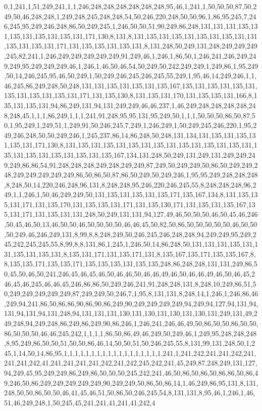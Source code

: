 0,1,241,1,51,249,241,1,1,246,248,248,248,248,248,248,95,46,1,241,1,50,50,50,87,50,249,50,46,248,248,1,249,248,245,248,248,54,50,246,220,248,50,50,96,1,86,95,245,7,246,245,95,249,246,248,86,50,249,245,1,246,50,50,51,90,249,86,248,131,131,131,135,131,135,131,135,131,135,131,171,130,8,131,8,131,135,131,135,131,135,131,135,131,131,135,131,135,131,171,131,135,135,131,135,131,8,131,248,50,249,131,248,249,249,249,245,82,241,1,246,249,249,249,249,249,91,249,46,1,246,1,86,50,1,246,241,246,249,249,249,95,249,249,249,46,1,246,1,46,50,46,54,50,249,50,242,249,249,1,249,86,1,95,249,50,14,246,245,95,46,50,249,1,50,249,246,245,246,245,55,249,1,95,46,14,249,246,1,1,46,245,86,249,248,50,248,131,131,135,131,135,131,135,167,135,131,135,131,135,131,135,131,135,131,135,131,171,131,135,130,8,131,135,131,170,131,135,135,131,166,8,135,131,135,131,94,86,249,131,94,131,249,249,46,46,237,1,46,249,248,248,248,248,248,248,45,1,1,1,86,249,1,1,1,241,91,248,95,95,131,95,249,50,1,1,1,50,50,50,86,50,87,50,1,95,249,1,249,51,1,249,91,50,246,245,7,249,1,246,249,1,50,249,245,246,220,1,95,249,246,248,50,50,249,246,1,245,237,86,14,86,248,50,248,131,134,131,135,131,135,131,135,131,171,130,8,131,135,131,135,131,135,131,135,131,135,131,135,131,135,131,135,131,135,131,135,131,135,131,135,167,134,131,248,50,249,131,249,131,249,249,249,249,86,86,54,91,248,248,248,249,248,249,249,87,249,50,249,249,50,86,50,249,249,248,249,249,249,249,249,86,50,86,50,87,86,50,249,50,249,246,1,95,95,249,248,248,248,8,248,50,14,220,246,248,96,131,8,248,248,95,246,220,246,245,55,8,248,248,248,96,249,1,1,246,1,50,46,249,249,50,131,135,131,135,131,135,171,135,167,134,8,131,135,135,131,171,131,135,170,131,135,135,131,171,131,135,130,171,131,135,131,135,167,135,131,171,131,135,131,131,248,50,249,131,131,94,127,49,46,50,50,50,46,50,45,46,246,50,45,46,50,13,46,50,50,46,50,50,50,50,46,46,45,50,82,50,86,50,50,50,50,50,46,50,50,50,249,46,246,249,131,8,99,8,8,248,249,50,246,245,246,248,248,94,249,249,95,249,245,242,245,245,55,8,99,8,8,131,86,1,245,1,246,50,14,86,248,50,131,131,131,135,131,131,135,131,135,131,8,135,131,171,131,135,171,131,8,135,167,135,171,135,135,167,8,8,135,135,171,135,135,171,135,135,135,131,135,135,248,86,248,248,131,131,249,86,50,45,50,46,50,241,246,45,46,45,46,50,46,46,50,46,46,49,46,50,46,46,49,46,50,46,45,246,45,46,245,46,46,45,246,86,86,50,249,246,241,91,248,248,131,8,248,10,249,86,51,50,249,249,249,249,249,87,249,249,50,246,7,1,95,8,131,131,8,248,14,1,246,1,246,86,46,249,94,241,86,50,86,86,90,86,90,86,249,90,249,249,249,249,94,249,94,127,94,131,94,131,94,131,94,131,248,94,131,131,131,130,131,130,131,130,131,130,131,249,131,49,249,248,94,249,248,86,249,86,249,90,86,246,1,246,241,246,46,49,50,86,50,50,86,50,50,86,50,50,50,46,46,245,242,1,1,1,1,86,50,86,49,46,249,50,249,46,1,249,95,248,248,248,8,95,249,86,50,50,51,50,50,86,46,14,50,50,51,50,246,245,55,8,131,99,131,248,50,1,245,1,14,50,14,86,95,1,1,1,1,1,1,1,1,1,1,1,1,1,1,1,1,1,1,241,1,241,242,241,241,242,241,241,241,242,41,241,241,241,241,242,241,242,245,242,241,45,249,87,248,249,131,127,94,249,45,95,249,249,86,249,86,50,50,50,245,242,241,46,50,86,50,86,50,86,86,50,86,49,246,50,86,249,249,249,249,249,90,249,249,50,86,50,86,14,1,46,249,86,95,131,8,131,248,50,50,86,50,50,46,41,45,46,51,50,86,50,246,245,54,8,131,131,8,95,46,1,246,1,46,51,46,249,248,1,50,245,45,241,241,41,241,41,242,4